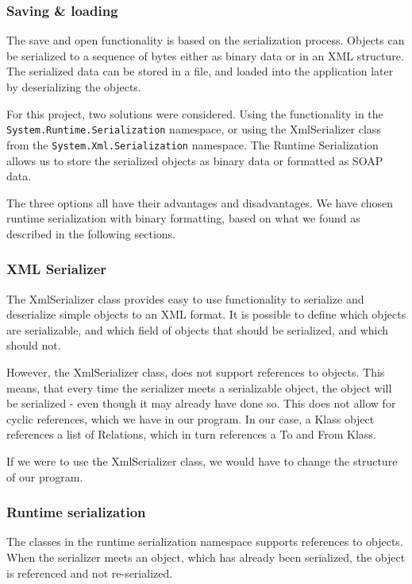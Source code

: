 \subsubsection{Saving \& loading}
The save and open functionality is based on the serialization process. Objects
can be serialized to a sequence of bytes either as binary data or in an XML
structure. The serialized data can be stored in a file, and loaded into the
application later by deserializing the objects.

For this project, two solutions were considered. Using the functionality in the
\texttt{System.Runtime.Serialization} namespace, or using the XmlSerializer
class from the \texttt{System.Xml.Serialization} namespace. The Runtime
Serialization allows us to store the serialized objects as binary data or
formatted as SOAP data.

The three options all have their advantages and disadvantages. We have chosen
runtime serialization with binary formatting, based on what we found as
described in the following sections.

\subsubsection{XML Serializer}

The XmlSerializer class provides easy to use
functionality to serialize and deserialize simple objects to an XML format. It
is possible to define which objects are serializable, and which field of objects
that should be serialized, and which should not.

However, the XmlSerializer class, does not support references to objects. This
means, that every time the serializer meets a serializable object, the object
will be serialized - even though it may already have done so. This does not
allow for cyclic references, which we have in our program. In our case, a Klass
object references a list of Relations, which in turn references a To and From
Klass.

If we were to use the XmlSerializer class, we would have to change the structure
of our program.

\subsubsection{Runtime serialization}

The classes in the runtime serialization
namespace supports references to objects. When the serializer meets an object,
which has already been serialized, the object is referenced and not
re-serialized.

